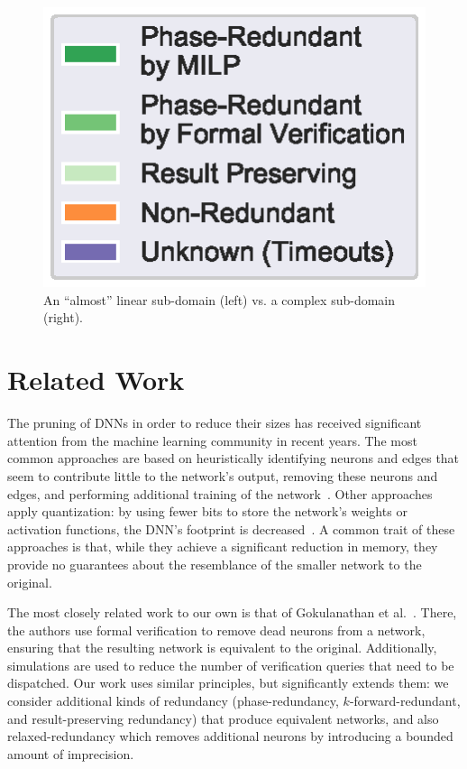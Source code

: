 \documentclass[10pt, conference, twocolumn, compsocconf]{IEEEtran}
\theoremstyle{remark}
\newcommand{\kfr}{$k$-forward-redundant}
\begin{document}
\begin{figure}[htp]
\begin{center}
\includegraphics[scale=0.6]{figures/legend}
\end{center}
\caption {An ``almost'' linear sub-domain (left) vs. a complex sub-domain (right).}
\label{fig:subspace_comp}
\end{figure}

\section{Related Work}
\label{sec:relatedWork}


The pruning of DNNs in order to reduce their sizes has received
significant attention from the machine learning community in recent
years. The most common approaches are based on heuristically
identifying neurons and edges that seem to contribute little to the
network's output, removing these neurons and edges, and performing
additional training of the
network~\cite{HaMaDa15,IaHaMoAsDaKe16}. Other approaches apply
quantization: by using fewer bits to store the network's weights or
activation functions, the DNN's footprint is
decreased~\cite{HuCoSoElBe17,RaOrReFa16,HuCoSoElBe16}. A common trait
of these approaches is that, while they achieve a significant reduction
in memory, they provide no guarantees about the resemblance of the
smaller network to the original.

The most closely related work to our own is that of Gokulanathan et
al.~\cite{GoFeMaBaKa20}. There, the authors use formal verification to
remove dead neurons from a network, ensuring that the resulting
network is equivalent to the original. Additionally, simulations are
used to reduce the number of verification queries that need to be
dispatched. Our work uses similar principles, but significantly
extends them: we consider additional kinds of redundancy
(phase-redundancy, \kfr{}, and result-preserving redundancy) that
produce equivalent networks, and also relaxed-redundancy which
removes additional neurons by introducing a bounded amount of
imprecision.
\end{document}
